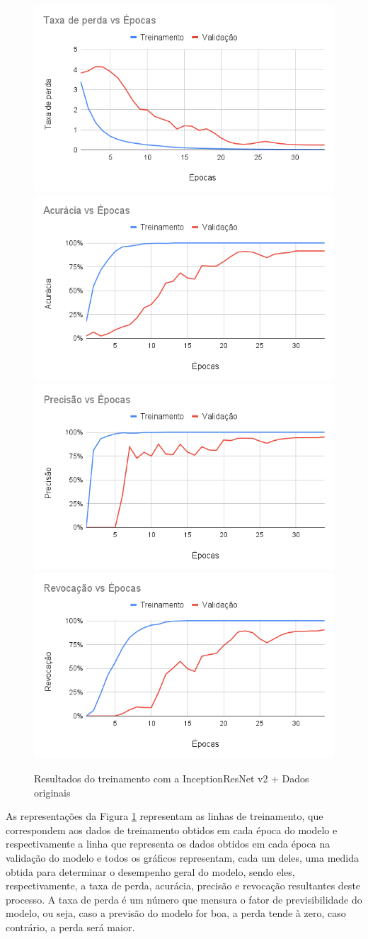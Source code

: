 \documentclass[
	12pt,				%
	oneside,			%
	a4paper,			%
	english,			%
	brazil				%
	]{abntex2ppgsi}
\begin{document}
\begin{figure}[H]
    \centering
    \caption{Resultados do treinamento com a InceptionResNet v2 + Dados originais}
    \includegraphics[width=.50\textwidth]{imagens/resultados_discussao/architecture/inception_resnet_v2/original/perda.png}\hfill
    \includegraphics[width=.50\textwidth]{imagens/resultados_discussao/architecture/inception_resnet_v2/original/acuracia.png}\bigbreak    \includegraphics[width=.50\textwidth]{imagens/resultados_discussao/architecture/inception_resnet_v2/original/precisao.png}\hfill
    \includegraphics[width=.50\textwidth]{imagens/resultados_discussao/architecture/inception_resnet_v2/original/revocacao.png}
    \label{fig:inception_resnet_v2_dados_originais}
\end{figure}

As representações da Figura \ref{fig:inception_resnet_v2_dados_originais} representam as linhas de treinamento, que correspondem aos dados de treinamento obtidos em cada época do modelo e respectivamente a linha que representa os dados obtidos em cada época na validação do modelo e todos os gráficos representam, cada um deles, uma medida obtida para determinar o desempenho geral do modelo, sendo eles, respectivamente, a taxa de perda, acurácia, precisão e revocação resultantes deste processo. A taxa de perda é um número que mensura o fator de previsibilidade do modelo, ou seja, caso a previsão do modelo for boa, a perda tende à zero, caso contrário, a perda será maior.
\end{document}
